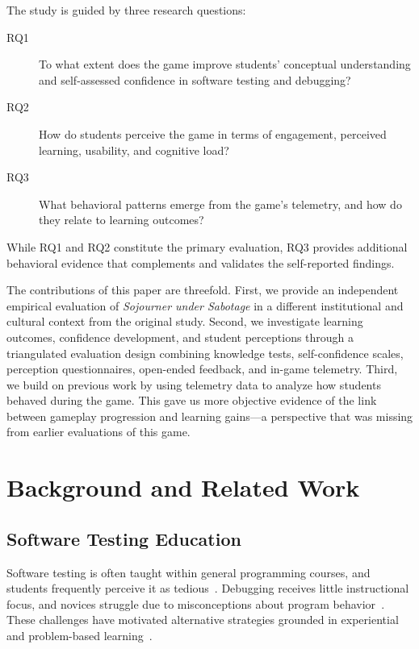 \documentclass[conference]{IEEEtran}
\begin{document}
The study is guided by three research questions:
\begin{description}
    \item[RQ1] To what extent does the game improve students' conceptual understanding and self-assessed confidence in software testing and debugging?
    \item[RQ2] How do students perceive the game in terms of engagement, perceived learning, usability, and cognitive load?
    \item[RQ3] What behavioral patterns emerge from the game's telemetry, and how do they relate to learning outcomes?
\end{description}
While RQ1 and RQ2 constitute the primary evaluation, RQ3 provides additional behavioral evidence that complements and validates the self-reported findings.

The contributions of this paper are threefold.
First, we provide an independent empirical evaluation of \emph{Sojourner under Sabotage} in a different institutional and cultural context from the original study.
Second, we investigate learning outcomes, confidence development, and student perceptions through a triangulated evaluation design combining knowledge tests, self-confidence scales, perception questionnaires, open-ended feedback, and in-game telemetry.
Third, we build on previous work by using telemetry data to analyze how students behaved during the game. This gave us more objective evidence of the link between gameplay progression and learning gains---a perspective that was missing from earlier evaluations of this game.

\section{Background and Related Work}
\label{sec:background}

\subsection{Software Testing Education}

Software testing is often taught within general programming courses, and students frequently perceive it as tedious~\cite{garousi2020testing, straubinger2023survey}.
Debugging receives little instructional focus, and novices struggle due to misconceptions about program behavior~\cite{mccauley2008debugging, li2019framework, bonar1985preprogramming, pea1986language}.
These challenges have motivated alternative strategies grounded in experiential~\cite{kolb1984experiential} and problem-based learning~\cite{hmelo2004problem, prince2004active}.
\end{document}
